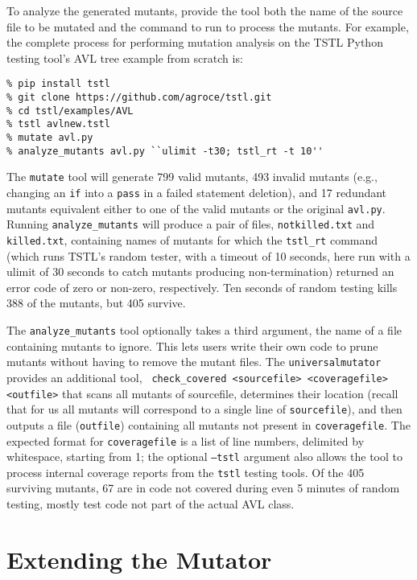 To analyze the generated mutants, provide the tool both the name of the
source file to be mutated and the command to run to process the
mutants.  For example, the complete process for performing mutation
analysis on the TSTL \cite{tstlsttt,nfm15} Python testing tool's AVL tree example from scratch is:

{\scriptsize
\begin{verbatim}
% pip install tstl
% git clone https://github.com/agroce/tstl.git
% cd tstl/examples/AVL
% tstl avlnew.tstl
% mutate avl.py
% analyze_mutants avl.py ``ulimit -t30; tstl_rt -t 10''
\end{verbatim}
}

The {\tt mutate} tool will generate 799 valid mutants, 493 invalid
mutants (e.g., changing an {\tt if} into a {\tt pass} in a failed
statement deletion), and 17 redundant mutants equivalent either to one
of the valid mutants or the original {\tt avl.py}.
Running {\tt analyze\_mutants} will produce a pair of files, {\tt notkilled.txt} and {\tt
  killed.txt}, containing names of mutants for which the {\tt tstl\_rt}
command (which runs TSTL's random tester, with a timeout of 10
seconds, here run with a ulimit of 30 seconds to catch mutants
producing non-termination)
returned an error code of zero or non-zero, respectively.  Ten seconds
of random testing kills 388 of the mutants, but 405 survive.

The {\tt analyze\_mutants} tool optionally takes a third argument, the
name of a file containing mutants to ignore.  This lets users write
their own code to prune mutants without having to remove the mutant
files.  The {\tt universalmutator} provides an additional tool, {\tt
  check\_covered <sourcefile> <coveragefile> <outfile>} that scans all
mutants of sourcefile, determines their location (recall that for us all mutants will correspond to a single line
of {\tt sourcefile}), and then outputs a file ({\tt outfile})
containing all mutants not present in {\tt coveragefile}.  The
expected format for {\tt coveragefile} is a list of line numbers,
delimited by whitespace, starting from 1; the optional {\tt --tstl}
argument also allows the tool to process internal coverage reports
from the {\tt tstl} testing tools.  Of the 405 surviving mutants, 67
are in code not covered during even 5 minutes of random testing, mostly test code not part of the actual AVL class.

\section{Extending the Mutator}

